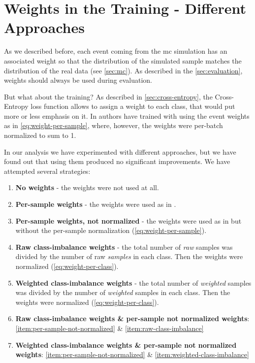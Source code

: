 \section{Weights in the Training - Different Approaches}
\label{sec:weights}

As we described before, each event coming from the \gls{mc} simulation has an associated weight so that the distribution
of the simulated sample matches the distribution of the real data (see \autoref{sec:mc}). As described in the
\autoref{sec:evaluation}, weights should always be used during evaluation.

But what about the training? As described in \autoref{sec:cross-entropy}, the Cross-Entropy loss function allows to
assign a weight to each class, that would put more or less emphasis on it. In \cite{jan} authors have trained with
using the event weights as in \autoref{eq:weight-per-sample}, where, however, the weights were per-batch normalized to
sum to 1.

In our analysis we have experimented with different approaches, but we have found out that using them produced no
significant improvements. We have attempted several strategies:

\begin{enumerate}
      \item \textbf{No weights} - the weights were not used at all.
      \item \textbf{Per-sample weights} - the weights were used as in \cite{jan}.
      \item \textbf{Per-sample weights, not normalized} - the weights were used as in \cite{jan} but without the
            per-sample normalization (\autoref{eq:weight-per-sample}). \label{item:per-sample-not-normalized}
      \item \textbf{Raw class-imbalance weights} - the total number of \emph{raw}
            samples was divided by the number of raw \emph{samples} in each class. Then the weights were normalized
            (\autoref{eq:weight-per-class}).  \label{item:raw-class-imbalance}
      \item \textbf{Weighted class-imbalance weights} - the total number of \emph{weighted} samples was divided by
            the number of \emph{weighted} samples in each class. Then the weights were normalized
            (\autoref{eq:weight-per-class}). \label{item:weighted-class-imbalance}
      \item \textbf{Raw class-imbalance weights \& per-sample not normalized weights}:
            \autoref{item:per-sample-not-normalized} \& \autoref{item:raw-class-imbalance}
      \item \textbf{Weighted class-imbalance weights \& per-sample not normalized weights}:
            \autoref{item:per-sample-not-normalized} \& \autoref{item:weighted-class-imbalance}
\end{enumerate}

